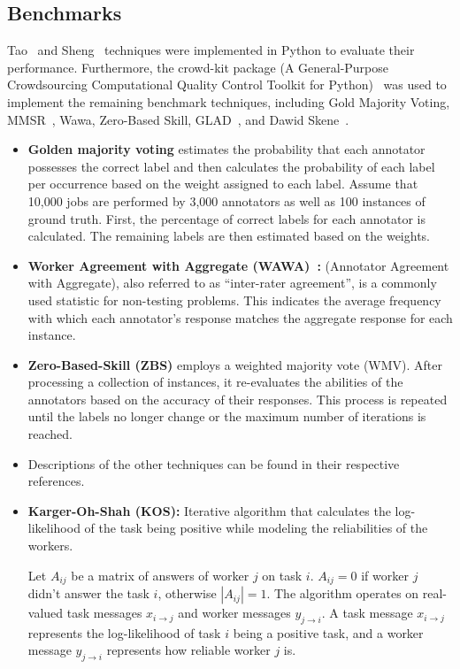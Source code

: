 \subsection{Benchmarks}
Tao~\cite{tao_Label_2020} and Sheng~\cite{sheng_Majority_2019} techniques were implemented in Python to evaluate their performance. Furthermore, the crowd-kit package (A General-Purpose Crowdsourcing Computational Quality Control Toolkit for Python)~\cite{ustalov_learning_2021 } was used to implement the remaining benchmark techniques, including Gold Majority Voting, MMSR~\cite{ma_Adversarial_2020}, Wawa, Zero-Based Skill, GLAD~\cite{whitehill_Whose_2009}, and Dawid Skene~\cite{dawid_Maximum_1979}.
%
\begin{itemize}
    \item \textbf{Golden majority voting} estimates the probability that each annotator possesses the correct label and then calculates the probability of each label per occurrence based on the weight assigned to each label. Assume that 10,000 jobs are performed by 3,000 annotators as well as 100 instances of ground truth. First, the percentage of correct labels for each annotator is calculated. The remaining labels are then estimated based on the weights.
    \item \textbf{Worker Agreement with Aggregate (WAWA)~\cite{crowdkit_wawa_2023}:} (Annotator Agreement with Aggregate), also referred to as ``inter-rater agreement'', is a commonly used statistic for non-testing problems. This indicates the average frequency with which each annotator's response matches the aggregate response for each instance.
    \item \textbf{Zero-Based-Skill (ZBS)} employs a weighted majority vote (WMV). After processing a collection of instances, it re-evaluates the abilities of the annotators based on the accuracy of their responses. This process is repeated until the labels no longer change or the maximum number of iterations is reached.
    \item Descriptions of the other techniques can be found in their respective references.
    \item \textbf{Karger-Oh-Shah (KOS):}
        Iterative algorithm that calculates the log-likelihood of the task being positive while modeling
        the reliabilities of the workers.

        Let $A_{ij}$ be a matrix of answers of worker $j$ on task $i$.
        $A_{ij} = 0$ if worker $j$ didn't answer the task $i$, otherwise $|A_{ij}| = 1$.
        The algorithm operates on real-valued task messages $x_{i \rightarrow j}$  and
        worker messages $y_{j \rightarrow i}$. A task message $x_{i \rightarrow j}$ represents
        the log-likelihood of task $i$ being a positive task, and a worker message $y_{j \rightarrow i}$ represents
        how reliable worker $j$ is.


\end{itemize}
